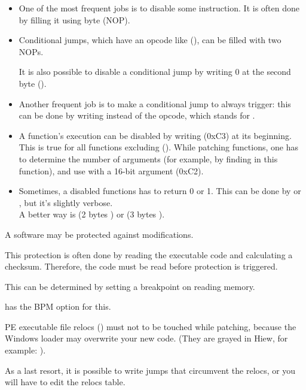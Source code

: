 \begin{itemize}

\item 
One of the most frequent jobs is to disable some instruction.
It is often done by filling it using byte 
 (\ac{NOP}).

\item Conditional jumps, which have an opcode like  (\JZ), 
can be filled with two \ac{NOP}s.

It is also possible to disable a conditional jump by writing 0 at the second byte ().

\item 
Another frequent job is to make a conditional jump to always trigger: 
this can be done by writing  
instead of the opcode, which stands for \JMP.

\item A function's execution can be disabled by writing \RETN (0xC3) at its beginning.
This is true for all functions excluding  ().
While patching  functions, one has to determine the number of arguments (for example, 
by finding \RETN in this function), 
and use \RETN with a 16-bit argument (0xC2).

\item Sometimes, a disabled functions has to return 0 or 1.
This can be done by  or , 
but it's slightly verbose.\\
A better way is  (2 bytes ) or  (3 bytes ).

\end{itemize}

A software may be protected against modifications.

This protection is often done by reading the executable code and calculating a checksum.
Therefore, 
the code must be read before protection is triggered.

This can be determined by setting a breakpoint on reading memory.

\tracer has the BPM option for this.

PE executable file relocs () 
must not to be touched while patching, 
because the Windows loader may overwrite your new code.
(They are grayed in Hiew, for example:
).

As a last resort, it is possible to write jumps that circumvent the relocs, 
or you will have to edit the relocs table.

